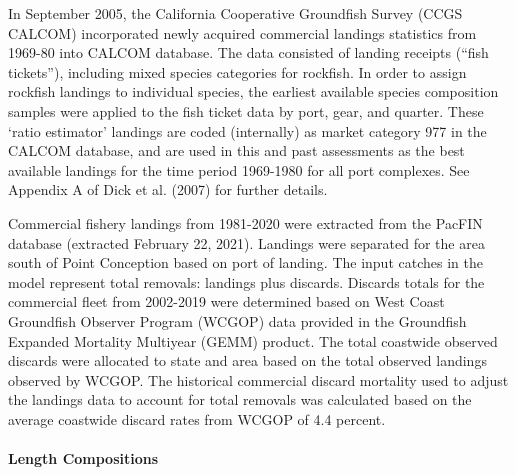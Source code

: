 \documentclass[11pt,
  english,
  a4paper,
]{article}
\begin{document}

In September 2005, the California Cooperative Groundfish Survey (CCGS CALCOM) incorporated newly acquired commercial landings statistics from 1969-80 into CALCOM database. The data consisted of landing receipts (``fish tickets''), including mixed species categories for rockfish. In order to assign rockfish landings to individual species, the earliest available species composition samples were applied to the fish ticket data by port, gear, and quarter. These `ratio estimator' landings are coded (internally) as market category 977 in the CALCOM database, and are used in this and past assessments as the best available landings for the time period 1969-1980 for all port complexes. See Appendix A of Dick et al. {(2007)\leavevmode\tagmcend\tagstructend} for further details.

\leavevmode\tagmcend\tagstructend\par


Commercial fishery landings from 1981-2020 were extracted from the PacFIN database (extracted February 22, 2021). Landings were separated for the area south of Point Conception based on port of landing. The input catches in the model represent total removals: landings plus discards. Discards totals for the commercial fleet from 2002-2019 were determined based on West Coast Groundfish Observer Program (WCGOP) data provided in the Groundfish Expanded Mortality Multiyear (GEMM) product. The total coastwide observed discards were allocated to state and area based on the total observed landings observed by WCGOP. The historical commercial discard mortality used to adjust the landings data to account for total removals was calculated based on the average coastwide discard rates from WCGOP of 4.4 percent.

\leavevmode\tagmcend\tagstructend\par


\hypertarget{length-compositions}{%
\paragraph{Length Compositions}\label{length-compositions}}

\leavevmode\tagmcend\tagstructend

\end{document}
